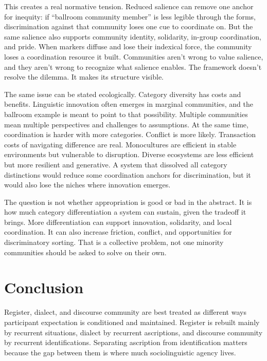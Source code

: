\documentclass[11pt,letterpaper]{article}
\begin{document}
This creates a real normative tension. Reduced salience can remove one anchor for inequity: if \enquote{ballroom community member} is less legible through the forms, discrimination against that community loses one cue to coordinate on. But the same salience also supports community identity, solidarity, in-group coordination, and pride. When markers diffuse and lose their indexical force, the community loses a coordination resource it built. Communities aren't wrong to value salience, and they aren't wrong to recognize what salience enables. The framework doesn't resolve the dilemma. It makes its structure visible.

The same issue can be stated ecologically. Category diversity has costs and benefits. Linguistic innovation often emerges in marginal communities, and the ballroom example is meant to point to that possibility. Multiple communities mean multiple perspectives and challenges to assumptions. At the same time, coordination is harder with more categories. Conflict is more likely. Transaction costs of navigating difference are real. Monocultures are efficient in stable environments but vulnerable to disruption. Diverse ecosystems are less efficient but more resilient and generative. A system that dissolved all category distinctions would reduce some coordination anchors for discrimination, but it would also lose the niches where innovation emerges.

The question is not whether appropriation is good or bad in the abstract. It is how much category differentiation a system can sustain, given the tradeoff it brings. More differentiation can support innovation, solidarity, and local coordination. It can also increase friction, conflict, and opportunities for discriminatory sorting. That is a collective problem, not one minority communities should be asked to solve on their own.

\section{Conclusion}

Register, dialect, and discourse community are best treated as different ways participant expectation is conditioned and maintained. Register is rebuilt mainly by recurrent situations, dialect by recurrent ascriptions, and discourse community by recurrent identifications. Separating ascription from identification matters because the gap between them is where much sociolinguistic agency lives.
\end{document}
